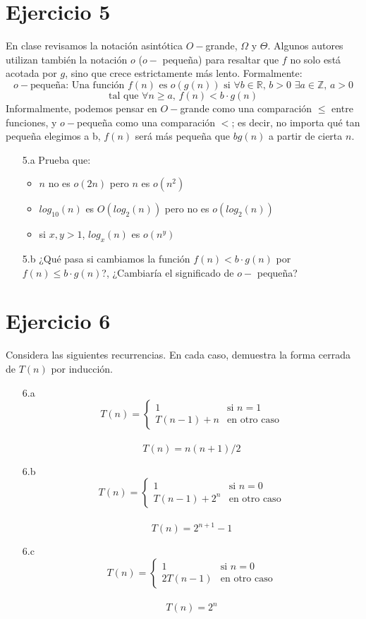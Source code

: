 \documentclass[12pt]{article}
\begin{document}
\section*{Ejercicio 5}
En clase revisamos la notación asintótica $O-$grande, $\Omega$ y $\Theta$. Algunos autores utilizan también la notación $o$ ($o-$ pequeña) para resaltar que $f$ no solo está acotada por $g$, sino que crece estrictamente más lento. Formalmente:
\[
    o-\text{pequeña: Una función } f(n) \text{ es } o(g(n)) \text{ si } \forall b \in \mathbb{R}, \, b>0 \,\, \exists a \in \mathbb{Z},\, a>0
\]
\[
    \text{tal que } \forall n \geq a, \, f(n) < b \cdot g(n)
\]
Informalmente, podemos pensar en $O-$grande como una comparación $\leq$ entre funciones, y $o-$pequeña como una comparación $<$; es decir, no importa qué tan pequeña elegimos a b, $f(n)$ será más pequeña que $bg(n)$ a partir de cierta $n$.
\begin{itemize}
    \item[5.a] Prueba que:
        \begin{itemize}
            \item $n$ no es $o(2n)$ pero $n$ es $o(n^2)$
            \item $log_{10}(n)$ es $O(log_2(n))$ pero no es $o(log_2(n))$
            \item si $x, y > 1$, $log_x(n)$ es $o(n^y)$
        \end{itemize}
    \item[5.b] ¿Qué pasa si cambiamos la función $f(n) < b \cdot g(n)$ por $f(n) \leq b \cdot g(n)$?, ¿Cambiaría el significado de $o-$ pequeña?
\end{itemize}

\section*{Ejercicio 6}
Considera las siguientes recurrencias. En cada caso, demuestra la forma cerrada de $T(n)$ por inducción.
\begin{itemize}
    \item[6.a]
    \[
        T(n) = \left\{ \begin{array}{ll}
        1 & \text{si } n=1\\ T(n-1)+n & \text{en otro caso} \end{array}\right.
    \]
    \\
    \[
        T(n) = n(n+1)/2
    \]
    \item[6.b]
    \[
        T(n) = \left\{ \begin{array}{ll}
        1 & \text{si } n=0\\ T(n-1)+2^n & \text{en otro caso} \end{array}\right.
    \]
    \\
    \[
        T(n) = 2^{n+1}-1
    \]
    \item[6.c]
    \[
        T(n) = \left\{ \begin{array}{ll}
        1 & \text{si } n=0\\ 2T(n-1) & \text{en otro caso} \end{array}\right.
    \]
    \\
    \[
        T(n) = 2^n
    \]
\end{itemize}
\end{document}
